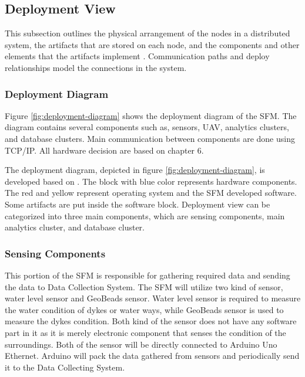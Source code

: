 \clearpage
\subsection{Deployment View}
\label{subsec:deploymentview}
This subsection outlines the physical arrangement of the nodes in a distributed system, the artifacts that are stored on each node, and the components and other elements that the artifacts implement \cite{ibmdeployment}. Communication paths and deploy relationships model the connections in the system.

\subsubsection{Deployment Diagram}
Figure \ref{fig:deployment-diagram} shows the deployment diagram of the \gls{SFM}. The diagram contains several components such as, sensors, \gls{UAV}, analytics clusters, and database clusters. Main communication between components are done using TCP/IP. All hardware decision are based on chapter 6.


The deployment diagram, depicted in figure \ref{fig:deployment-diagram}, is developed based on \cite{ibmdeployment}. The block with blue color represents hardware components. The red and yellow represent operating system and the SFM developed software. Some artifacts are put inside the software block. Deployment view can be categorized into three main components, which are sensing components, main analytics cluster, and database cluster.

\subsubsection*{Sensing Components}
This portion of the \gls{SFM} is responsible for gathering required data and sending the data to Data Collection System. The \gls{SFM} will utilize two kind of sensor, water level sensor and GeoBeads sensor. Water level sensor is required to measure the water condition of dykes or water ways, while GeoBeads sensor is used to measure the dykes condition. Both kind of the sensor does not have any software part in it as it is merely electronic component that senses the condition of the surroundings. Both of the sensor will be directly connected to Arduino Uno Ethernet. Arduino will pack the data gathered from sensors and periodically send it to the Data Collecting System.

